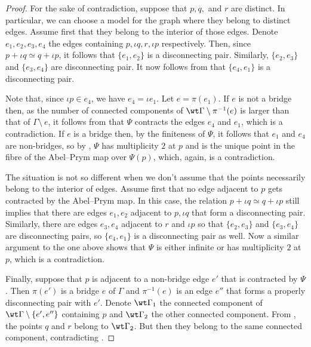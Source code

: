 \begin{proof}
For the sake of contradiction, suppose that $p,q,$ and $r$ are distinct. In particular, we can choose a model for the graph where they belong to distinct edges. Assume first that they belong to the interior of those edges. Denote $e_1,e_2,e_3,e_4$  the edges containing $p,\iota q,r,\iota p$ respectively. 
    Then, since $p+\iota q\simeq q+\iota p$, it follows that $\{e_1,e_2\}$ is a disconnecting pair. Similarly, $\{e_2, e_3\}$ and $\{e_3, e_4\}$ are disconnecting pair. It now follows from  that $\{e_4,e_1\}$ is a disconnecting pair. 
    
    Note that, since $\iota p\in e_4$, we have $e_4 = \iota e_1$. Let $e = \pi(e_1)$. If $e$ is not a bridge then, as the number of connected components of $\wt\Gamma\setminus\pi^{-1}(e)$ is larger than that of $\Gamma\setminus\ e$, it follows from  that $\Psi$ contracts the edges $e_4$ and $e_1$, which is a contradiction. If $e$ is a bridge then, by the finiteness of $\Psi$,  it follows that $e_1$ and $e_4$ are non-bridges,  so by , $\Psi$ has multiplicity $2$ at $p$ and is the unique point in the fibre of the Abel--Prym map over $\Psi(p)$, which, again, is a contradiction. 
    
    The situation is not so different when we don't assume that the points necessarily belong to the interior of edges. Assume first that no edge adjacent to $p$ gets contracted by the Abel--Prym map. 
    In this case,  the relation $p+\iota q\simeq q+\iota p$ still implies that there are edges $e_1,e_2$ adjacent to $p,\iota q$ that form a disconnecting pair. Similarly, there are edges $e_3,e_4$ adjacent to $r$ and $\iota p$ so that $\{e_2,e_3\}$ and $\{e_3,e_4\}$ are disconnecting pairs, so $\{e_4,e_1\}$ is a disconnecting pair as well. Now a similar argument to the one above shows that $\Psi$ is either infinite or has multiplicity $2$ at $p$, which is a contradiction.  

Finally, suppose that $p$ is adjacent to a non-bridge edge $e'$ that is contracted by $\Psi$. Then $\pi(e')$ is a bridge $e$ of $\Gamma$ and $\pi^{-1}(e)$ is an edge $e''$ that forms a properly disconnecting pair with $e'$. Denote $\wt\Gamma_1$ the connected component of $\wt\Gamma\setminus \{e',e''\}$ containing $p$ and $\wt\Gamma_2$ the other connected component. 
From , the points $q$ and $r$ belong to $\wt\Gamma_2$. But then they belong to the same connected component, contradicting . 
\end{proof}

